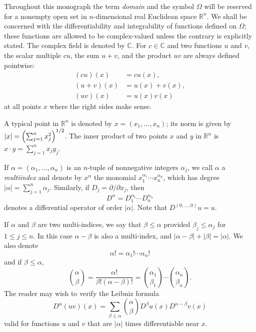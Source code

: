 \begin{para}
  Throughout this monograph the term \emph{domain} and the symbol
  $\Omega$ will be reserved for a nonempty open set in $n$-dimensional
  real Euclidean space $\mathbb{R}^n$.
  We shall be concerned with the differentiability and integrability
  of functions defined on $\Omega$; these functions are allowed to be
  complex-valued unless the contrary is explicitly stated. The complex
  field is denoted by $\mathbb{C}$. For $c\in\mathbb{C}$ and two functions
  $u$ and $v$, the scalar multiple $cu$, the sum $u+v$,
  and the product $uv$ are always defined pointwise:
  \begin{align*}
    (cu)(x) & = cu(x), \\
    (u+v)(x) & = u(x) + v(x), \\
    (uv)(x) & = u(x)v(x)
  \end{align*}
  at all points $x$ where the right sides make sense.

  A typical point in $\mathbb{R}^n$ is denoted by $x=(x_1,\dots,x_n)$;
  its norm is given by $|x| = \Bigl(\sum_{j=1}^n x_j^2\Bigr)^{1/2}$.
  The inner product of two points $x$ and $y$ in $\mathbb{R}^n$ is
  $x\cdot y = \sum_{j=1}^n x_jy_j$.

  If $\alpha = (\alpha_1,\dots,\alpha_n)$ is an $n$-tuple of nonnegative
  integers $\alpha_j$, we call $\alpha$ a \emph{multiindex} and denote
  by $x^{\alpha}$ the monomial $x_1^{\alpha_1}\cdots x_n^{\alpha_n}$,
  which has degree $|\alpha| = \sum_{j=1}^n \alpha_j$.
  Similarly, if $D_j=\partial/\partial x_j$, then
  \[D^{\alpha} = D_1^{\alpha_1}\cdots D_n^{\alpha_n}\]
  denotes a differential operator of order $|\alpha|$.
  Note that $D^{(0,\dots,0)}u=u$.

  If $\alpha$ and $\beta$ are two multi-indices, we say that $\beta\leq\alpha$
  provided $\beta_j\leq \alpha_j$ for $1\leq j\leq n$.
  In this case $\alpha-\beta$ is also a multi-index, and
  $|\alpha-\beta| + |\beta| = |\alpha|$. We also denote
  \[\alpha! = \alpha_1!\cdots\alpha_n!\]
  and if $\beta\leq\alpha$,
  \[\binom{\alpha}{\beta} = \frac{\alpha!}{\beta!(\alpha-\beta)!}
    = \binom{\alpha_1}{\beta_1}\cdots\binom{\alpha_n}{\beta_n}.\]
  The reader may wish to verify the Leibniz formula
  \[D^{\alpha}(uv)(x) = \sum_{\beta\leq\alpha} \binom{\alpha}{\beta}
    D^{\beta} u(x) D^{\alpha-\beta} v(x)\]
    valid for functions $u$ and $v$ that are $|\alpha|$ times differentiable
    near $x$.
\end{para}


